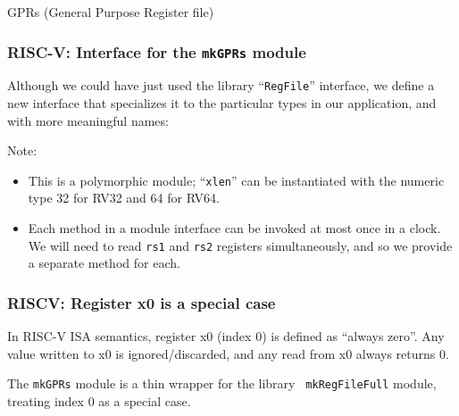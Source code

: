 \begin{frame}

\begin{center}
  {\LARGE GPRs (General Purpose Register file)}
\end{center}

\end{frame}


\begin{frame}[fragile]
\frametitle{RISC-V: Interface for the {\tt mkGPRs} module}

\footnotesize

Although we could have just used the {\BSV} library ``{\tt RegFile}''
interface, we define a new interface that specializes it to the
particular types in our application, and with more meaningful names:

\vspace{2ex}


\vspace{2ex}
Note:
\begin{itemize}

 \item This is a polymorphic module; ``{\tt xlen}'' can be
   instantiated with the numeric type 32 for RV32 and 64 for RV64.

 \item Each method in a module interface can be invoked at most once
   in a clock.  We will need to read {\tt rs1} and {\tt rs2} registers
   simultaneously, and so we provide a separate method for each.

\end{itemize}

\end{frame}


\begin{frame}[fragile]
\frametitle{RISCV: Register x0 is a special case}

\footnotesize

In RISC-V ISA semantics, register x0 (index 0) is defined as ``always
zero''. Any value written to x0 is ignored/discarded, and any read
from x0 always returns 0.

\vspace{1ex}

The {\tt mkGPRs} module is a thin wrapper for the {\BSV} library {\tt
  mkRegFileFull} module, treating index 0 as a special case.

\vspace{1ex}


\end{frame}

